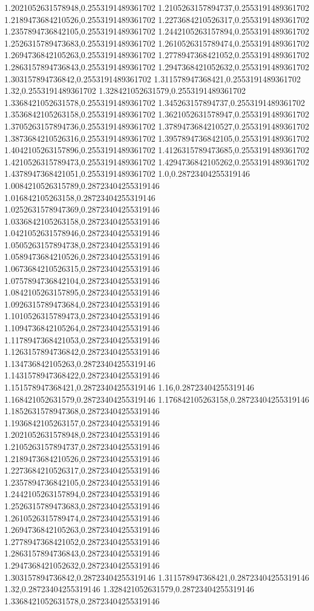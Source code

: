 1.2021052631578948,0.2553191489361702
1.2105263157894737,0.2553191489361702
1.2189473684210526,0.2553191489361702
1.2273684210526317,0.2553191489361702
1.2357894736842105,0.2553191489361702
1.2442105263157894,0.2553191489361702
1.2526315789473683,0.2553191489361702
1.2610526315789474,0.2553191489361702
1.2694736842105263,0.2553191489361702
1.2778947368421052,0.2553191489361702
1.2863157894736843,0.2553191489361702
1.2947368421052632,0.2553191489361702
1.303157894736842,0.2553191489361702
1.311578947368421,0.2553191489361702
1.32,0.2553191489361702
1.328421052631579,0.2553191489361702
1.3368421052631578,0.2553191489361702
1.345263157894737,0.2553191489361702
1.3536842105263158,0.2553191489361702
1.3621052631578947,0.2553191489361702
1.3705263157894736,0.2553191489361702
1.3789473684210527,0.2553191489361702
1.3873684210526316,0.2553191489361702
1.3957894736842105,0.2553191489361702
1.4042105263157896,0.2553191489361702
1.4126315789473685,0.2553191489361702
1.4210526315789473,0.2553191489361702
1.4294736842105262,0.2553191489361702
1.4378947368421051,0.2553191489361702
1.0,0.28723404255319146
1.0084210526315789,0.28723404255319146
1.016842105263158,0.28723404255319146
1.0252631578947369,0.28723404255319146
1.0336842105263158,0.28723404255319146
1.0421052631578946,0.28723404255319146
1.0505263157894738,0.28723404255319146
1.0589473684210526,0.28723404255319146
1.0673684210526315,0.28723404255319146
1.0757894736842104,0.28723404255319146
1.0842105263157895,0.28723404255319146
1.0926315789473684,0.28723404255319146
1.1010526315789473,0.28723404255319146
1.1094736842105264,0.28723404255319146
1.1178947368421053,0.28723404255319146
1.1263157894736842,0.28723404255319146
1.134736842105263,0.28723404255319146
1.1431578947368422,0.28723404255319146
1.151578947368421,0.28723404255319146
1.16,0.28723404255319146
1.168421052631579,0.28723404255319146
1.176842105263158,0.28723404255319146
1.1852631578947368,0.28723404255319146
1.1936842105263157,0.28723404255319146
1.2021052631578948,0.28723404255319146
1.2105263157894737,0.28723404255319146
1.2189473684210526,0.28723404255319146
1.2273684210526317,0.28723404255319146
1.2357894736842105,0.28723404255319146
1.2442105263157894,0.28723404255319146
1.2526315789473683,0.28723404255319146
1.2610526315789474,0.28723404255319146
1.2694736842105263,0.28723404255319146
1.2778947368421052,0.28723404255319146
1.2863157894736843,0.28723404255319146
1.2947368421052632,0.28723404255319146
1.303157894736842,0.28723404255319146
1.311578947368421,0.28723404255319146
1.32,0.28723404255319146
1.328421052631579,0.28723404255319146
1.3368421052631578,0.28723404255319146
